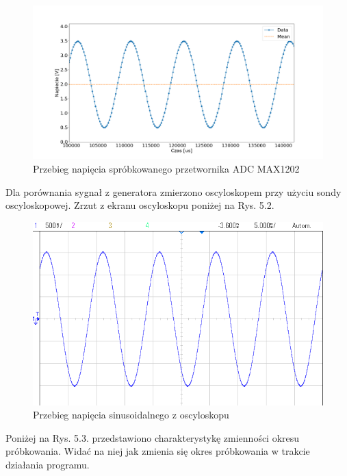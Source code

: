 \begin{figure}[h]
		\includegraphics[width=14cm]{sin_max1202_100Hz_adc}
	\caption{Przebieg napięcia spróbkowanego przetwornika ADC MAX1202} 
	\label{fig:sin_max1202_100Hz_adc}
\end{figure}

Dla porównania sygnał z generatora zmierzono oscyloskopem przy użyciu sondy oscyloskopowej. Zrzut z ekranu oscyloskopu poniżej na Rys. 5.2.

\begin{figure}[h]
	\centering
		\includegraphics[width=12cm]{sin_max1202_100Hz_osc.png}
	\caption{Przebieg napięcia sinusoidalnego z oscyloskopu} 
	\label{fig:sin_max1202_100Hz_osc}
\end{figure}

Poniżej na Rys. 5.3. przedstawiono charakterystykę zmienności okresu próbkowania. Widać na niej jak zmienia się okres próbkowania w trakcie działania programu.

